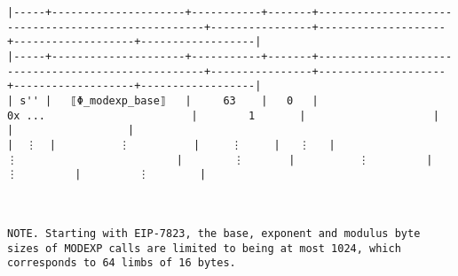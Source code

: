 \documentclass[varwidth=\maxdimen,margin=0.5cm,multi={verbatim}]{standalone}
\begin{document}
\begin{verbatim}
|-----+---------------------+-----------+-------+----------------------------------------------------+----------------+--------------------+-------------------+------------------|
|-----+---------------------+-----------+-------+----------------------------------------------------+----------------+--------------------+-------------------+------------------|
| s'' |   ⟦Φ_modexp_base⟧   |     63    |   0   |                       0x ...                       |        1       |                    |                   |                  |
|  ⋮  |          ⋮          |     ⋮     |   ⋮   |                          ⋮                         |        ⋮       |          ⋮         |         ⋮         |         ⋮        |



NOTE. Starting with EIP-7823, the base, exponent and modulus byte sizes of MODEXP calls are limited to being at most 1024, which corresponds to 64 limbs of 16 bytes.
\end{verbatim}
\end{document}
